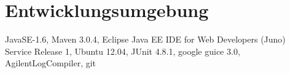 \section{Entwicklungsumgebung}\label{Entwicklungsumgebung}
JavaSE-1.6, Maven 3.0.4, Eclipse Java EE IDE for Web Developers (Juno) Ser\-vice Release 1, Ubuntu 12.04, JUnit 4.8.1, google guice 3.0, AgilentLogCompiler, git